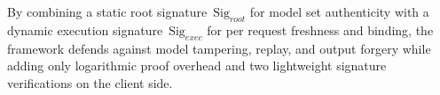\documentclass{ieeeaccess}
\begin{document}
By combining a static root signature~$\textrm{Sig}_{root}$ for model set authenticity with a dynamic execution signature~$\textrm{Sig}_{exec}$ for per request freshness and binding, the framework defends against model tampering, replay, and output forgery while adding only logarithmic proof overhead and two lightweight signature verifications on the client side.





\end{document}
